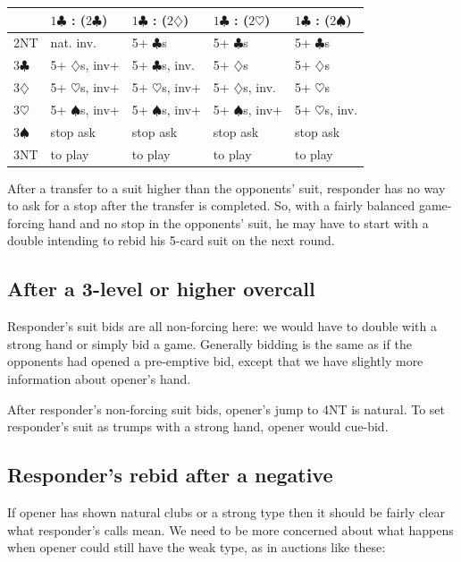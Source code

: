\documentclass{article}
\newcommand{\sz}{\spadesuit}
\newcommand{\hz}{\heartsuit}
\newcommand{\dz}{\diamondsuit}
\newcommand{\cz}{\clubsuit}
\newcommand{\st}{\rule{0pt}{4mm}}
\begin{document}
\begin{center}
\begin{tabular}{|l|p{2cm}|p{2cm}|p{2cm}|p{2cm}|} \hline
 & \st $1\cz$ : ($2\cz$) & $1\cz$ : ($2\dz$) & $1\cz$ : ($2\hz$) & $1\cz$ : ($2\sz$) \\ \hline
2NT & \st nat. inv. & 5+ $\cz$s & 5+ $\cz$s & 5+ $\cz$s \\ \hline
$3\cz$ & \st 5+ $\dz$s, inv+ & 5+ $\cz$s, inv. &  5+ $\dz$s & 5+ $\dz$s \\ \hline
$3\dz$ & \st 5+ $\hz$s, inv+ & 5+ $\hz$s, inv+ & 5+ $\dz$s, inv. & 5+ $\hz$s \\ \hline
$3\hz$ & \st 5+ $\sz$s, inv+ & 5+ $\sz$s, inv+ & 5+ $\sz$s, inv+ & 5+ $\hz$s, inv. \\ \hline
$3\sz$ & \st stop ask & stop ask & stop ask & stop ask \\ \hline
3NT & \st to play & to play & to play & to play \\ \hline
\end{tabular}
\end{center}

\vspace{3mm}
After a transfer to a suit higher than the opponents' suit, responder has no way to ask for a stop after the transfer is completed. So, with a fairly balanced game-forcing hand and no stop in the opponents' suit, he may have to start with a double intending to rebid his 5-card suit on the next round.

\subsection{After a 3-level or higher overcall}

Responder's suit bids are all non-forcing here: we would have to double with a strong hand or simply bid a game. Generally bidding is the same as if the opponents had opened a pre-emptive bid, except that we have slightly more information about opener's hand.

After responder's non-forcing suit bids, opener's jump to 4NT is natural. To set responder's suit as trumps with a strong hand, opener would cue-bid.

\subsection{Responder's rebid after a negative}

If opener has shown natural clubs or a strong type then it should be fairly clear what responder's calls mean. We need to be more concerned about what happens when opener could still have the weak type, as in auctions like these:
\end{document}
